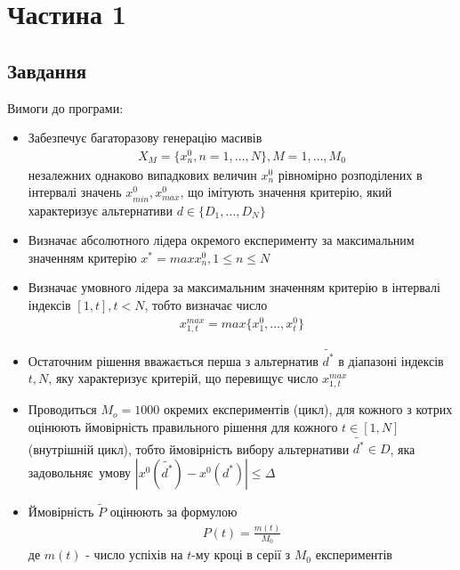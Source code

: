 \section{Частина 1}
\label{sec:task1}

\subsection{Завдання}
\label{subsec:task1_task}

Вимоги до програми:
\begin{itemize}
      \item Забезпечує багаторазову генерацію масивів
            \begin{align}
                  X_M = \{x_n^0, n = 1, \dots, N\}, M = 1, \dots, M_0
            \end{align}
            незалежних однаково випадкових величин $x_n^0$ рівномірно розподілених
            в інтервалі значень $x_{min}^0, x_{max}^0$, що імітують значення критерію,
            який характеризує альтернативи $d \in \{D_1, \dots, D_N\}$
      \item Визначає абсолютного лідера окремого експерименту за максимальним
            значенням критерію $x^* = max x_n^0, 1 \leq n \leq N$
      \item Визначає умовного лідера за максимальним значенням критерію в інтервалі
            індексів $[1, t], t < N$, тобто визначає число
            \begin{align}
                  x_{1, t}^{max} = max \{x_1^0, \dots, x_t^0\}
            \end{align}
      \item Остаточним рішення вважається перша з альтернатив $\widetilde{d^*}$
            в діапазоні індексів $t, N$, яку характеризує критерій,
            що перевищує число $x_{1, t}^{max}$
      \item Проводиться $M_o = 1000$ окремих експериментів (цикл), для кожного з
            котрих оцінюють ймовірність правильного рішення для кожного
            $t \in [1, N]$ (внутрішній цикл), тобто ймовірність вибору альтернативи
            $\widetilde{d^*} \in D$, яка задовольняє умову
            $|x^0(\widetilde{d^*}) - x^0(d^*)| \leq \Delta$
      \item Ймовірність $\widetilde{P}$ оцінюють за формулою
            \begin{align}
                  P(t) = \frac{m(t)}{M_0}
            \end{align}
            де $m(t)$ - число успіхів на $t$-му кроці в серії з $M_0$ експериментів

\end{itemize}
